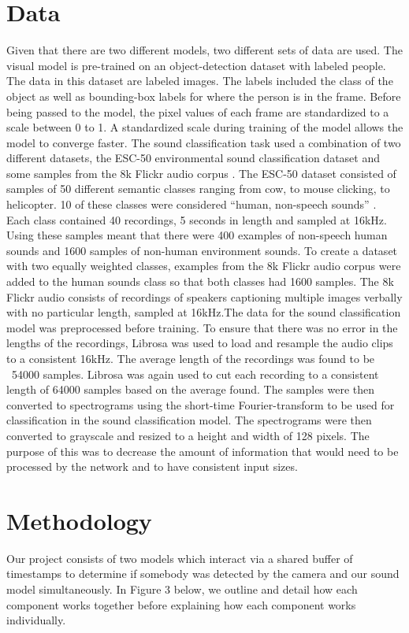 \documentclass{article}
\begin{document}
\section{Data}
Given that there are two different models, two different sets of data are used. The visual model is pre-trained on an object-detection dataset with labeled people. The data in this dataset are labeled images. The labels included the class of the object as well as bounding-box labels for where the person is in the frame. Before being passed to the model, the pixel values of each frame are standardized to a scale between 0 to 1. A standardized scale during training of the model allows the model to converge faster. The sound classification task used a combination of two different datasets, the ESC-50 \cite{3} environmental sound classification dataset and some samples from the 8k Flickr audio corpus \cite{3}. The ESC-50 dataset consisted of samples of 50 different semantic classes ranging from cow, to mouse clicking, to helicopter. 10 of these classes were considered “human, non-speech sounds” \cite{3}. Each class contained 40 recordings, 5 seconds in length and sampled at 16kHz. Using these samples meant that there were 400 examples of non-speech human sounds and 1600 samples of non-human environment sounds. To create a dataset with two equally weighted classes, examples from the 8k Flickr audio corpus were added to the human sounds class so that both classes had 1600 samples. The 8k Flickr audio consists of recordings of speakers captioning multiple images verbally with no particular length, sampled at 16kHz.The data for the sound classification model was preprocessed before training. To ensure that there was no error in the lengths of the recordings, Librosa was used to load and resample the audio clips to a consistent 16kHz. The average length of the recordings was found to be ~54000 samples. Librosa was again used to cut each recording to a consistent length of 64000 samples based on the average found. The samples were then converted to spectrograms using the short-time Fourier-transform to be used for classification in the sound classification model. The spectrograms were then converted to grayscale and resized to a height and width of 128 pixels. The purpose of this was to decrease the amount of information that would need to be processed by the network and to have consistent input sizes.

\section{Methodology}
Our project consists of two models which interact via a shared buffer of timestamps to determine if somebody was detected by the camera and our sound model simultaneously. In Figure 3 below, we outline and detail how each component works together before explaining how each component works individually.
\end{document}
